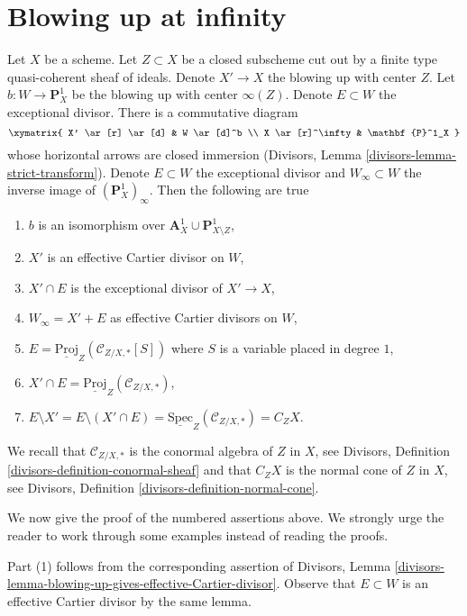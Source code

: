 \section{Blowing up at infinity}
\label{section-blowup-Z-first}

\noindent
Let $X$ be a scheme. Let $Z \subset X$ be a closed subscheme cut out
by a finite type quasi-coherent sheaf of ideals. Denote $X' \to X$
the blowing up with center $Z$. Let $b : W \to \mathbf{P}^1_X$ be the
blowing up with center $\infty(Z)$. Denote $E \subset W$ the exceptional
divisor. There is a commutative diagram
$$
\xymatrix{
X' \ar[r] \ar[d] & W \ar[d]^b \\
X \ar[r]^\infty & \mathbf{P}^1_X
}
$$
whose horizontal arrows are closed immersion
(Divisors, Lemma \ref{divisors-lemma-strict-transform}). Denote $E \subset W$
the exceptional divisor and $W_\infty \subset W$ the inverse image
of $(\mathbf{P}^1_X)_\infty$. Then the following are true
\begin{enumerate}
\item $b$ is an isomorphism over
$\mathbf{A}^1_X \cup \mathbf{P}^1_{X \setminus Z}$,
\item $X'$ is an effective Cartier divisor on $W$,
\item $X' \cap E$ is the exceptional divisor of $X' \to X$,
\item $W_\infty = X' + E$ as effective Cartier divisors on $W$,
\item $E = \underline{\text{Proj}}_Z(\mathcal{C}_{Z/X, *}[S])$ where $S$
is a variable placed in degree $1$,
\item $X' \cap E = \underline{\text{Proj}}_Z(\mathcal{C}_{Z/X, *})$,
\item
\label{item-cone-is-open}
$E \setminus X' = E \setminus (X' \cap E) =
\underline{\text{Spec}}_Z(\mathcal{C}_{Z/X, *}) = C_ZX$.
\end{enumerate}
We recall that $\mathcal{C}_{Z/X, *}$ is the conormal algebra of $Z$ in $X$,
see Divisors, Definition \ref{divisors-definition-conormal-sheaf} and
that $C_ZX$ is the normal cone of $Z$ in $X$, see
Divisors, Definition \ref{divisors-definition-normal-cone}.

\medskip\noindent
We now give the proof of the numbered assertions above. We strongly
urge the reader to work through some examples instead of reading the
proofs.

\medskip\noindent
Part (1) follows from the corresponding assertion of Divisors, Lemma
\ref{divisors-lemma-blowing-up-gives-effective-Cartier-divisor}.
Observe that $E \subset W$ is an effective Cartier divisor by the same lemma.

